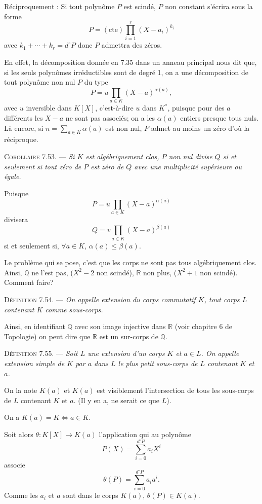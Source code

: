 Réciproquement : Si tout polynôme $P$ est scindé, $P$ non constant s'écrira sous la forme
\[
P=(\mathrm{cte})\prod_{i=1}^r(X-a_i)^{k_i}
\]
avec $k_1+\cdots+k_r=d^\circ P$ donc $P$ admettra des zéros.

En effet, la décomposition donnée en 7.35 dans un anneau principal nous dit que, si les seuls polynômes irréductibles sont de degré 1, on a une décomposition de tout polynôme non nul $P$ du type
\[
P=u\prod_{a\in K}(X-a)^{\alpha(a)},
\]
avec $u$ inversible dans $K[X]$, c'est-à-dire $u$ dans $K^*$, puisque pour des $a$ différents les $X-a$ ne sont pas associés; on a les $\alpha(a)$ entiers presque tous nuls. Là encore, si $n=\sum_{a\in K}\alpha(a)$ est non nul, $P$ admet au moins un zéro d'où la réciproque. \bookend

\medskip\noindent\textsc{Corollaire 7.53.} --- \emph{Si $K$ est algébriquement clos, $P$ non nul divise $Q$ si et seulement si tout zéro de $P$ est zéro de $Q$ avec une multiplicité supérieure ou égale.}

Puisque
\[
P=u\prod_{a\in K}(X-a)^{\alpha(a)}
\]
divisera
\[
Q=v\prod_{a\in K}(X-a)^{\beta(a)}
\]
si et seulement si, $\forall a\in K$, $\alpha(a)\le\beta(a)$. \bookend

Le problème qui se pose, c'est que les corps ne sont pas tous algébriquement clos. Ainsi, $\mathbb Q$ ne l'est pas, ($X^2-2$ non scindé), $\mathbb R$ non plus, ($X^2+1$ non scindé). Comment faire?

\medskip\noindent\textsc{Définition 7.54.} --- \emph{On appelle extension du corps commutatif $K$, tout corps $L$ contenant $K$ comme sous-corps.}

Ainsi, en identifiant $\mathbb Q$ avec son image injective dans $\mathbb R$ (voir chapitre 6 de Topologie) on peut dire que $\mathbb R$ est un sur-corps de $\mathbb Q$.

\medskip\noindent\textsc{Définition 7.55.} --- \emph{Soit $L$ une extension d'un corps $K$ et $a\in L$. On appelle extension simple de $K$ par $a$ dans $L$ le plus petit sous-corps de $L$ contenant $K$ et $a$.}

On la note $K(a)$ et $K(a)$ est visiblement l'intersection de tous les sous-corps de $L$ contenant $K$ et $a$. (Il y en a, ne serait ce que $L$).

On a $K(a)=K\Longleftrightarrow a\in K$.

Soit alors $\theta:K[X]\longrightarrow K(a)$ l'application qui au polynôme
\[
P(X)=\sum_{i=0}^{d^\circ P}a_iX^i
\]
associe
\[
\theta(P)=\sum_{i=0}^{d^\circ P}a_i a^i.
\]
Comme les $a_i$ et $a$ sont dans le corps $K(a)$, $\theta(P)\in K(a)$.

